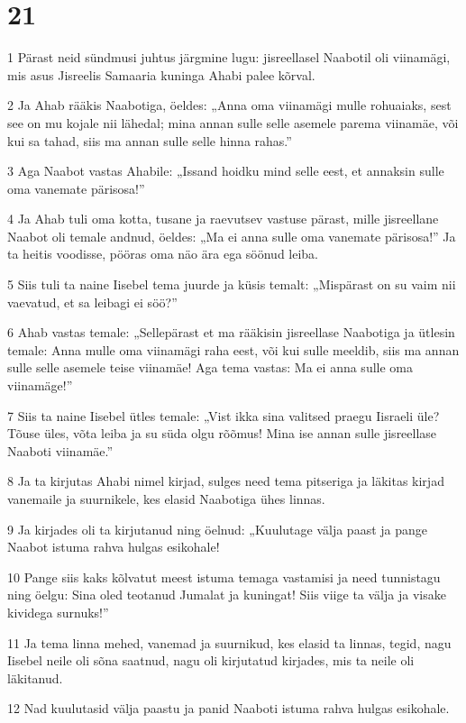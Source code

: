 \chapter{21}

\par 1 Pärast neid sündmusi juhtus järgmine lugu: jisreellasel Naabotil oli viinamägi, mis asus Jisreelis Samaaria kuninga Ahabi palee kõrval.
\par 2 Ja Ahab rääkis Naabotiga, öeldes: „Anna oma viinamägi mulle rohuaiaks, sest see on mu kojale nii lähedal; mina annan sulle selle asemele parema viinamäe, või kui sa tahad, siis ma annan sulle selle hinna rahas.”
\par 3 Aga Naabot vastas Ahabile: „Issand hoidku mind selle eest, et annaksin sulle oma vanemate pärisosa!”
\par 4 Ja Ahab tuli oma kotta, tusane ja raevutsev vastuse pärast, mille jisreellane Naabot oli temale andnud, öeldes: „Ma ei anna sulle oma vanemate pärisosa!” Ja ta heitis voodisse, pööras oma näo ära ega söönud leiba.
\par 5 Siis tuli ta naine Iisebel tema juurde ja küsis temalt: „Mispärast on su vaim nii vaevatud, et sa leibagi ei söö?”
\par 6 Ahab vastas temale: „Sellepärast et ma rääkisin jisreellase Naabotiga ja ütlesin temale: Anna mulle oma viinamägi raha eest, või kui sulle meeldib, siis ma annan sulle selle asemele teise viinamäe! Aga tema vastas: Ma ei anna sulle oma viinamäge!”
\par 7 Siis ta naine Iisebel ütles temale: „Vist ikka sina valitsed praegu Iisraeli üle? Tõuse üles, võta leiba ja su süda olgu rõõmus! Mina ise annan sulle jisreellase Naaboti viinamäe.”
\par 8 Ja ta kirjutas Ahabi nimel kirjad, sulges need tema pitseriga ja läkitas kirjad vanemaile ja suurnikele, kes elasid Naabotiga ühes linnas.
\par 9 Ja kirjades oli ta kirjutanud ning öelnud: „Kuulutage välja paast ja pange Naabot istuma rahva hulgas esikohale!
\par 10 Pange siis kaks kõlvatut meest istuma temaga vastamisi ja need tunnistagu ning öelgu: Sina oled teotanud Jumalat ja kuningat! Siis viige ta välja ja visake kividega surnuks!”
\par 11 Ja tema linna mehed, vanemad ja suurnikud, kes elasid ta linnas, tegid, nagu Iisebel neile oli sõna saatnud, nagu oli kirjutatud kirjades, mis ta neile oli läkitanud.
\par 12 Nad kuulutasid välja paastu ja panid Naaboti istuma rahva hulgas esikohale.
